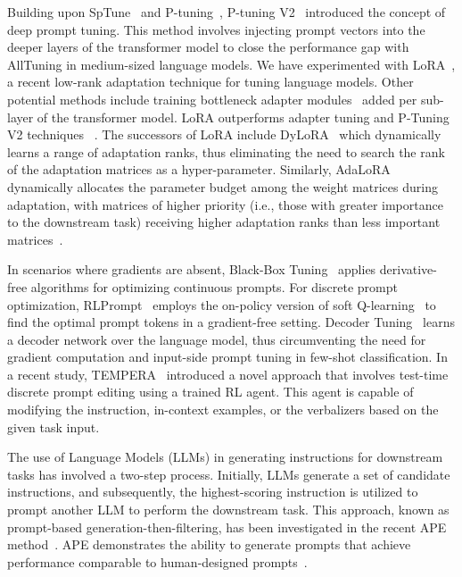 \documentclass[11pt]{article}
\begin{document}
Building upon SpTune~\cite{lester-etal-2021-power} and P-tuning~\cite{li-liang-2021-prefix}, P-tuning V2~\cite{liu-etal-2022-p} introduced the concept of deep prompt tuning. This method involves injecting prompt vectors into the deeper layers of the transformer model to close the performance gap with AllTuning in medium-sized language models. We have experimented with LoRA~\cite{DBLP:journals/corr/abs-2106-09685}, a recent low-rank adaptation technique for tuning language models. Other potential methods include training bottleneck adapter modules~\cite{DBLP:journals/corr/abs-1902-00751, lin-etal-2020-exploring} added per sub-layer of the transformer model. LoRA outperforms adapter tuning and P-Tuning V2 techniques ~\cite{DBLP:journals/corr/abs-2106-09685}. The successors of LoRA include DyLoRA~\cite{valipour-etal-2023-dylora}  which dynamically learns a range of adaptation ranks, thus eliminating the need to search the rank of the adaptation matrices as a hyper-parameter. Similarly, AdaLoRA dynamically allocates the parameter budget among the weight matrices during adaptation, with matrices of higher priority (i.e., those with greater importance to the downstream task) receiving higher adaptation ranks than less important matrices~\cite{zhang2023adaptive}.

In scenarios where gradients are absent, Black-Box Tuning~\cite{DBLP:journals/corr/abs-2201-03514} applies derivative-free algorithms for optimizing continuous prompts. For discrete prompt optimization, RLPrompt~\cite{deng-etal-2022-rlprompt} employs the on-policy version of soft Q-learning~\cite{https://doi.org/10.48550/arxiv.2106.07704} to find the optimal prompt tokens in a gradient-free setting. Decoder Tuning~\cite{cui-etal-2023-decoder} learns a decoder network over the language model, thus circumventing the need for gradient computation and input-side prompt tuning in few-shot classification. In a recent study, TEMPERA~\cite{zhang2022tempera} introduced a novel approach that involves test-time discrete prompt editing using a trained RL agent. This agent is capable of modifying the instruction, in-context examples, or the verbalizers based on the given task input. 

The use of Language Models (LLMs) in generating instructions for downstream tasks has involved a two-step process. Initially, LLMs generate a set of candidate instructions, and subsequently, the highest-scoring instruction is utilized to prompt another LLM to perform the downstream task. This approach, known as prompt-based generation-then-filtering, has been investigated in the recent APE method~\cite{zhou2023large}. APE demonstrates the ability to generate prompts that achieve performance comparable to human-designed prompts~\cite{zhou2023large}.
\end{document}
